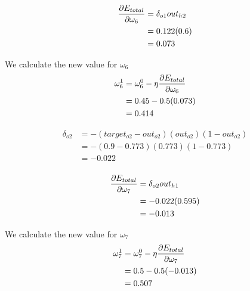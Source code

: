 \documentclass[10pt,a4paper]{article}
\begin{document}
\begin{equation}
\begin{split}
\pdv{E_{total}}{\omega_6} &= \delta_{o1}out_{h2}\\
                          &= 0.122(0.6)\\
                          &= 0.073\\
\end{split}
\end{equation}

We calculate the new value for $\omega_6$
\begin{equation}
\begin{split}
\omega_6^1 &= \omega_6^0 - \eta\pdv{E_{total}}{\omega_6}\\
           &= 0.45 -0.5(0.073)\\
           &= 0.414\\
\end{split}
\end{equation}

\begin{equation}
\begin{split}
\delta_{o2} &= -(target_{o2} -out_{o2})(out_{o2})(1-out_{o2})\\
            &= -(0.9-0.773)(0.773)(1-0.773)\\
            &= -0.022\\
\end{split}
\end{equation}

\begin{equation}
\begin{split}
\pdv{E_{total}}{\omega_7} &= \delta_{o2}out_{h1}\\
                          &= -0.022(0.595)\\
                          &= -0.013\\
\end{split}
\end{equation}

We calculate the new value for $\omega_7$
\begin{equation}
\begin{split}
\omega_7^1 &= \omega_7^0 - \eta\pdv{E_{total}}{\omega_7}\\
           &= 0.5 -0.5(-0.013)\\
           &= 0.507\\
\end{split}
\end{equation}
\end{document}
